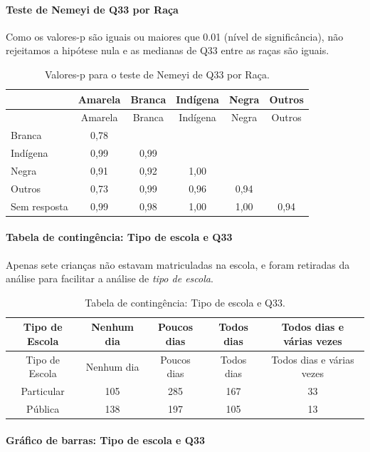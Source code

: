 \documentclass[]{article}
\let\oldparagraph\paragraph
\renewcommand{\paragraph}[1]{\oldparagraph{#1}\mbox{}}
\begin{document}
\hypertarget{teste-de-nemeyi-de-q33-por-rauxe7a}{%
\paragraph{Teste de Nemeyi de Q33 por Raça}\label{teste-de-nemeyi-de-q33-por-rauxe7a}}

Como os valores-p são iguais ou maiores que 0.01 (nível de significância), não rejeitamos a hipótese nula e as medianas de Q33 entre as raças são iguais.

\begin{longtable}[]{@{}lccccc@{}}
\caption{\label{tab:unnamed-chunk-1173}Valores-p para o teste de Nemeyi de Q33 por Raça.}\tabularnewline
\toprule
& Amarela & Branca & Indígena & Negra & Outros\tabularnewline
\midrule
\endfirsthead
\toprule
& Amarela & Branca & Indígena & Negra & Outros\tabularnewline
\midrule
\endhead
Branca & 0,78 & & & &\tabularnewline
Indígena & 0,99 & 0,99 & & &\tabularnewline
Negra & 0,91 & 0,92 & 1,00 & &\tabularnewline
Outros & 0,73 & 0,99 & 0,96 & 0,94 &\tabularnewline
Sem resposta & 0,99 & 0,98 & 1,00 & 1,00 & 0,94\tabularnewline
\bottomrule
\end{longtable}

\cleardoublepage

\hypertarget{tabela-de-continguxeancia-tipo-de-escola-e-q33}{%
\paragraph{Tabela de contingência: Tipo de escola e Q33}\label{tabela-de-continguxeancia-tipo-de-escola-e-q33}}

Apenas sete crianças não estavam matriculadas na escola, e foram retiradas da análise para facilitar a análise de \emph{tipo de escola}.

\begin{longtable}[]{@{}ccccc@{}}
\caption{\label{tab:unnamed-chunk-1174}Tabela de contingência: Tipo de escola e Q33.}\tabularnewline
\toprule
Tipo de Escola & Nenhum dia & Poucos dias & Todos dias & Todos dias e várias vezes\tabularnewline
\midrule
\endfirsthead
\toprule
Tipo de Escola & Nenhum dia & Poucos dias & Todos dias & Todos dias e várias vezes\tabularnewline
\midrule
\endhead
Particular & 105 & 285 & 167 & 33\tabularnewline
Pública & 138 & 197 & 105 & 13\tabularnewline
\bottomrule
\end{longtable}

\hypertarget{gruxe1fico-de-barras-tipo-de-escola-e-q33}{%
\paragraph{Gráfico de barras: Tipo de escola e Q33}\label{gruxe1fico-de-barras-tipo-de-escola-e-q33}}
\end{document}
